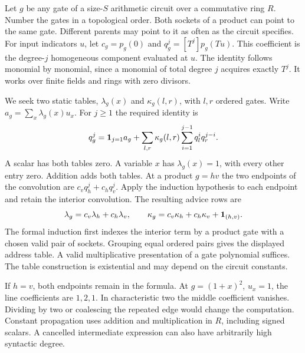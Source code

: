\clearpage
{}\label{sec:14compiler}

Let $g$ be any gate of a size-$S$ arithmetic circuit over a commutative ring $R$. Number the gates in a topological order. Both sockets of a product can point to the same gate. Different parents may point to it as often as the circuit specifies. For input indicators $u$, let $c_g=p_g(0)$ and $q_g^j=[T^j]p_g(Tu)$. This coefficient is the degree-$j$ homogeneous component evaluated at $u$. The identity follows monomial by monomial, since a monomial of total degree $j$ acquires exactly $T^j$. It works over finite fields and rings with zero divisors.

We seek two static tables, $\lambda_g(x)$ and $\kappa_g(l,r)$, with $l,r$ ordered gates. Write $a_g=\sum_x\lambda_g(x)u_x$. For $j\ge1$ the required identity is
\[
q_g^j={\bf1}_{j=1}a_g
 +\sum_{l,r}\kappa_g(l,r)\sum_{i=1}^{j-1}q_l^i q_r^{j-i}.
\]
A scalar has both tables zero. A variable $x$ has $\lambda_g(x)=1$, with every other entry zero. Addition adds both tables. At a product $g=hv$ the two endpoints of the convolution are $c_v q_h^j+c_hq_v^j$. Apply the induction hypothesis to each endpoint and retain the interior convolution. The resulting advice rows are
\[
\lambda_g=c_v\lambda_h+c_h\lambda_v,\qquad
\kappa_g=c_v\kappa_h+c_h\kappa_v+{\bf1}_{(h,v)} .
\]
The formal induction first indexes the interior term by a product gate with a chosen valid pair of sockets. Grouping equal ordered pairs gives the displayed address table. A valid multiplicative presentation of a gate polynomial suffices. The table construction is existential and may depend on the circuit constants.

If $h=v$, both endpoints remain in the formula. At $g=(1+x)^2$, $u_x=1$, the line coefficients are $1,2,1$. In characteristic two the middle coefficient vanishes. Dividing by two or coalescing the repeated edge would change the computation. Constant propagation uses addition and multiplication in $R$, including signed scalars. A cancelled intermediate expression can also have arbitrarily high syntactic degree.


